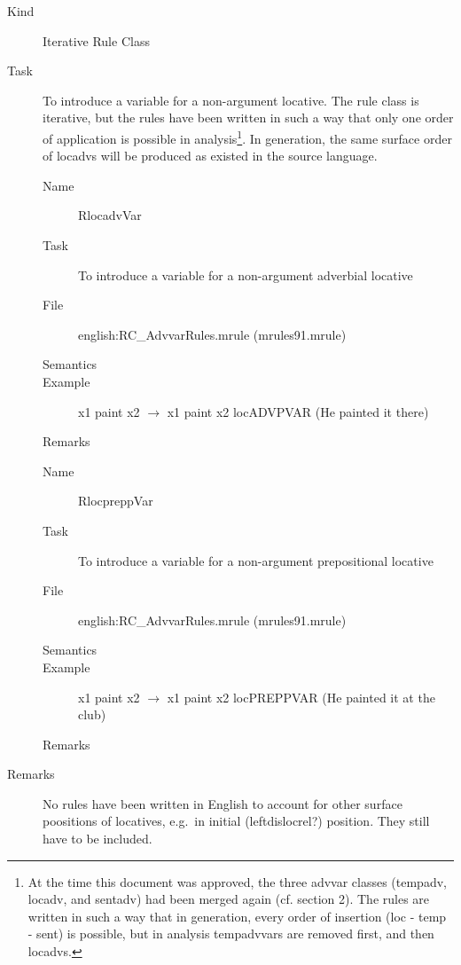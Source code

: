 \begin{description}
\item[Kind] Iterative Rule Class
\item[Task] To introduce a variable for a non-argument locative. The rule class 
is iterative, but the rules have been written in such a way that only one order 
of application is possible in analysis\footnote{At the time this document 
was approved, the three advvar classes (tempadv, locadv, and sentadv) had been 
merged again (cf. section 2). The rules are 
written in such a way that in generation, every order of insertion (loc - temp 
- sent) is possible, but in analysis tempadvvars are removed first, and then 
locadvs.}. In generation, the same surface order of locadvs will be produced as 
existed in the source language.

\vspace{1 cm}
\begin{description}
\item[Name] RlocadvVar
\item[Task] To introduce a variable for a non-argument adverbial locative
\item[File] english:RC\_AdvvarRules.mrule (mrules91.mrule)
\item[Semantics]
\item[Example] x1 paint x2 $\rightarrow$ x1 paint x2 locADVPVAR (He painted it 
there)
\item[Remarks]
\end{description}

\vspace{1 cm}
\begin{description}
\item[Name] RlocpreppVar
\item[Task] To introduce a variable for a non-argument prepositional locative
\item[File] english:RC\_AdvvarRules.mrule (mrules91.mrule)
\item[Semantics]
\item[Example] x1 paint x2 $\rightarrow$ x1 paint x2 locPREPPVAR (He painted it 
at the club)
\item[Remarks]
\end{description}

\item[Remarks] No rules have been written in English to account for other 
surface poositions of locatives, e.g.\ in initial (leftdislocrel?) position. 
They still have to be included.
\end{description}

